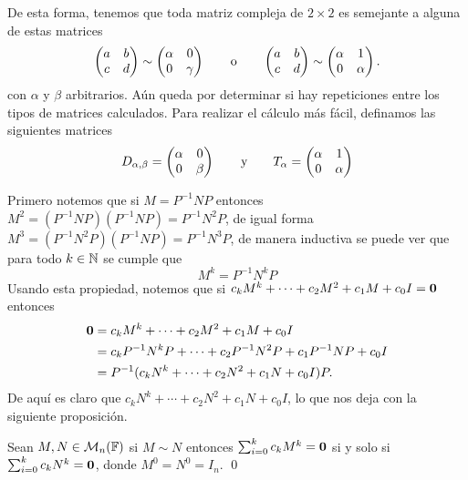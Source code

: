 De esta forma, tenemos que toda matriz compleja de $2 \times 2$ es semejante a alguna de estas matrices
\begin{equation}
  \begin{pmatrix} a & b \\ c & d \end{pmatrix} \sim \begin{pmatrix} \alpha & 0 \\ 0 & \gamma \end{pmatrix}
    \qquad\text{o}\qquad
    \begin{pmatrix} a & b \\ c & d \end{pmatrix} \sim \begin{pmatrix} \alpha & 1 \\ 0 & \alpha \end{pmatrix}.
      \label{eq:M2Form}
\end{equation}
con $\alpha$ y $\beta$ arbitrarios. Aún queda por determinar si hay repeticiones entre los tipos de matrices calculados. Para realizar el cálculo más fácil, definamos las siguientes matrices 
\[
  D_{\alpha,\beta} = \begin{pmatrix} \alpha & 0 \\ 0 & \beta \end{pmatrix}
     \qquad\text{y}\qquad
  T_\alpha = \begin{pmatrix} \alpha & 1 \\ 0 & \alpha \end{pmatrix}
\]

Primero notemos que si $M = P^{-1} N P$ entonces $M^2 = (P^{-1} N P)(P^{-1} N P) = P^{-1}N^2 P$, de igual forma $M^3 = (P^{-1}N^2 P) (P^{-1} N P) = P^{-1}N^3 P$, de manera inductiva se puede ver que para todo $k \in \mathbb{N}$ se cumple que
\[
  M^k = P^{-1} N^k P
\]
Usando esta propiedad, notemos que si $c_k M^k + \cdots + c_2 M^2 + c_1 M + c_0 I = \mathbf{0}$ entonces
\begin{align*}
  \mathbf{0} &= c_k M^k + \cdots + c_2 M^2 + c_1 M + c_0 I \\
    &= c_k P^{-1}N^k P + \cdots + c_2 P^{-1}N^2 P + c_1 P^{-1}N P + c_0 I \\
    &= P^{-1} (c_k N^k + \cdots + c_2 N^2 + c_1 N + c_0 I) P.
\end{align*}
De aquí es claro que $c_k N^k + \cdots + c_2 N^2 + c_1 N + c_0 I$, lo que nos deja con la siguiente proposición.

\begin{prop} \label{prop:MPolySem}
  Sean $M, N \in \mathcal{M}_n(\mathbb{F})$ si $M \sim N$ entonces $\sum_{i=0}^k c_k M^k = \mathbf{0}$ si y solo si $\sum_{i=0}^k c_k N^k = \mathbf{0}$, donde $M^0 = N^0= I_n$. \qed
\end{prop}

